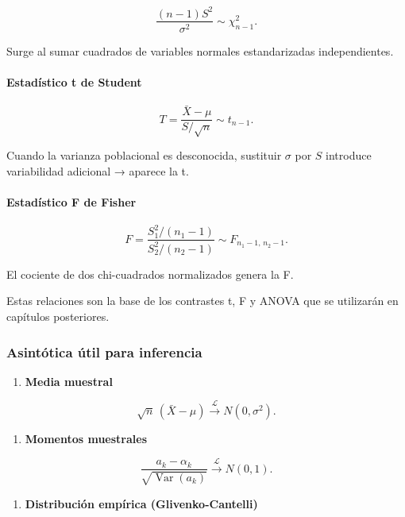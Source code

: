 \documentclass[
]{article}
\providecommand{\tightlist}{%
  \setlength{\itemsep}{0pt}\setlength{\parskip}{0pt}}
\begin{document}
\[
\frac{(n-1)S^2}{\sigma^2}\sim \chi^2_{n-1}.
\]

Surge al sumar cuadrados de variables normales estandarizadas independientes.

\paragraph{Estadístico t de Student}\label{estaduxedstico-t-de-student}

\[
T = \frac{\bar X - \mu}{S/\sqrt{n}}
\sim t_{n-1}.
\]

Cuando la varianza poblacional es desconocida, sustituir \(\sigma\) por \(S\) introduce variabilidad adicional → aparece la t.

\paragraph{Estadístico F de Fisher}\label{estaduxedstico-f-de-fisher}

\[
F = \frac{S_1^2/(n_1-1)}{S_2^2/(n_2-1)}
\sim F_{n_1-1,\,n_2-1}.
\]

El cociente de dos chi-cuadrados normalizados genera la F.

Estas relaciones son la base de los contrastes t, F y ANOVA que se utilizarán en capítulos posteriores.

\subsubsection{Asintótica útil para inferencia}\label{asintuxf3tica-uxfatil-para-inferencia}

\begin{enumerate}
\def\labelenumi{\arabic{enumi}.}
\tightlist
\item
  \textbf{Media muestral}
\end{enumerate}

\[
\sqrt{n}\,(\bar X - \mu)\xrightarrow{\mathcal{L}} N(0,\sigma^2).
\]

\begin{enumerate}
\def\labelenumi{\arabic{enumi}.}
\setcounter{enumi}{1}
\tightlist
\item
  \textbf{Momentos muestrales}
\end{enumerate}

\[
\frac{a_k - \alpha_k}{\sqrt{\operatorname{Var}(a_k)}}
\xrightarrow{\mathcal{L}} N(0,1).
\]

\begin{enumerate}
\def\labelenumi{\arabic{enumi}.}
\setcounter{enumi}{2}
\tightlist
\item
  \textbf{Distribución empírica (Glivenko-Cantelli)}
\end{enumerate}
\end{document}
